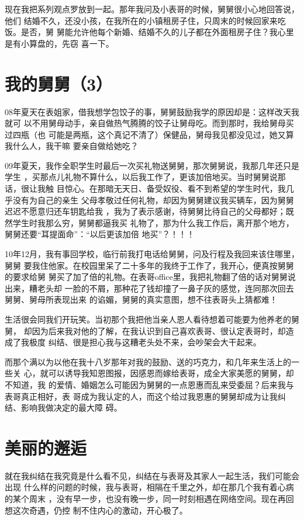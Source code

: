 \documentclass[12pt]{book}
\begin{document}
现在我把系列观点罗放到一起。那年我问及小表哥的时候，舅舅很小心地回答说，他们
结婚不久，还没小孩，在我所在的小镇租房子住，只周末的时候回家来吃饭。是否，舅
舅能允许他每个新婚、结婚不久的儿子都在外面租房子住？我心里是有小算盘的，先窃
喜一下。
\section{我的舅舅（3）}
\label{sec-9-61}

08年夏天在表姐家，借我想学包饺子的事，舅舅鼓励我学的原因却是：这样改天我就可
以不用舅母动手，亲自做热气腾腾的饺子让舅母吃。而到那时，我给舅母买过四瓶（也
可能是两瓶，这个真记不清了）保健品，舅母我见都没见过，她又算我什么人，我干嘛
要亲自做给她吃？

09年夏天，我作全职学生时最后一次买礼物送舅舅，那次舅舅说，我那几年还只是学生
，买那点儿礼物不算什么，以后我工作了，更该加倍地买。当时舅舅说那话，很让我触
目惊心。在那暗无天日、备受奴役、看不到希望的学生时代，我几乎没有为自己的亲生
父母孝敬过任何礼物，却因为舅舅建议我买辆车，因为舅舅迟迟不愿意归还车钥匙给我
，我为了表示感谢，待舅舅比待自己的父母都好；既然学生时我那么穷，舅舅都逼我买
礼物了，那为什么我工作后，离开那个地方，舅舅还要“耳提面命”：“以后更该加倍
地买”？！！！

10年12月，我有事回学校，临行前我打电话给舅舅，问及行程及我回来该住哪里，舅舅
要我住他家。在校园里呆了二十多年的我终于工作了，我开心，便真按舅舅的要求给舅
舅买了加了倍的礼物。在表哥office里，我把礼物翻了倍的话对舅舅说出来，糟老头却
一脸的不屑，那种花了钱却撞了一鼻子灰的感觉，连同那次回去舅舅、舅母所表现出来
的谄媚，舅舅的真实意图，想不往表哥头上猜都难！

生活很会同我们开玩笑。当初那个我把他当亲人恩人看待想着可能要为他养老的舅舅，
却因为后来我对他的了解，在我认识到自己喜欢表哥、很认定表哥时，却造成了我极度
纠结、很是担心我与这糟老头处不来，会吵架会大干起来。

而那个满以为以他在我十八岁那年对我的鼓励、送的巧克力，和几年来生活上的一些关
心，就可以诱导我知恩图报，因感恩而嫁给表哥，成全大家美愿的舅舅，却不知道，我
的爱情、婚姻怎么可能因为舅舅的一点恩惠而乱来受委屈？后来我与表哥真正相好，表
哥成为我认定的人，而这个给过我恩惠的舅舅却成为让我纠结、影响我做决定的最大障
碍。
\section{美丽的邂逅}
\label{sec-9-62}

就在我纠结在我究竟是什么看不见，纠结在与表哥及其家人一起生活，我们可能会出现
什么样的问题的时候，我与表哥，相隔在千里之外，却在那几个我有着心病的某个周末
，没有早一步，也没有晚一步，同一时刻相遇在网络空间。现在再回想这次奇遇，仍控
制不住内心的激动，开心极了。
\end{document}
